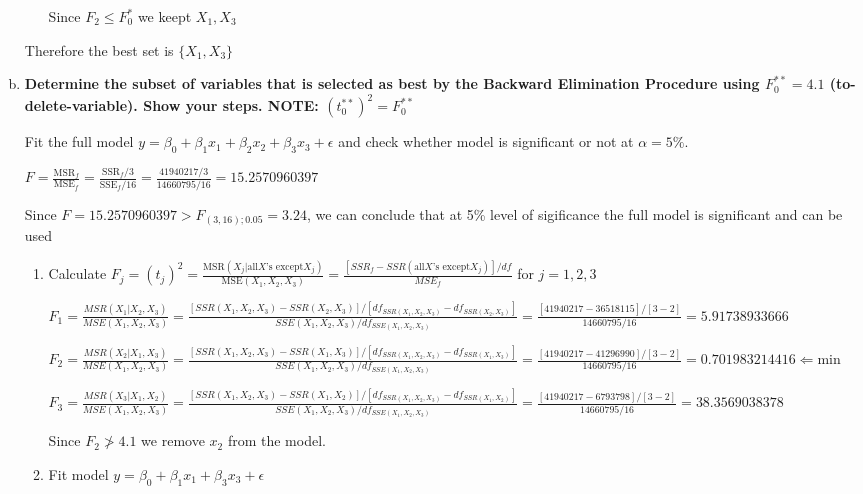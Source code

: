 \documentclass{article}
\begin{document}
\begin{enumerate}[(a)]
\begin{enumerate}[(1)]
Since $F_2 \leq F_0^*$ we keept $X_1, X_3$

\end{enumerate}

Therefore the best set is $\{X_1, X_3\}$

\item \textbf{Determine the subset of variables that is selected as best by the Backward Elimination
Procedure using $F_0^{**} = 4.1$ (to-delete-variable). Show your steps.
NOTE: $( t_0^{**} )^2 = F_0^{**}$}

Fit the full model $y = \beta_0 + \beta_1x_1 + \beta_2x_2 + \beta_3 x_3 + \epsilon$ and check whether model is significant or not at $\alpha=5\%$.

$F = \frac{\text{MSR}_f}{\text{MSE}_f} = \frac{\text{SSR}_f / 3}{\text{SSE}_f / 16} = \frac{ 41 940 217/3}{14 660 795/16} = 15.2570960397$

Since $F = 15.2570960397 > F_{(3, 16); 0.05} = 3.24$, we can conclude that at 5\% level of sigificance the full model is significant and can be used

\begin{enumerate}[(1)]

\item Calculate $F_j = (t_j)^2 = \frac{ \text{MSR}(X_j | \text{all} X \text{'s except} X_j) }{\text{MSE}(X_1, X_2, X_3)} = \frac{ [SSR_f - SSR(\text{all} X\text{'s except} X_j)]/df}{MSE_f}$ for $j = 1,2,3$

$F_1 =
\frac{ MSR(X_1 | X_2, X_3)
}{
MSE(X_1, X_2, X_3)
}
=
\frac{
[SSR(X_1, X_2, X_3) - SSR(X_2, X_3)]/[df_{SSR(X_1,X_2,X_3)} - df_{SSR(X_2,X_3)}]
}{
SSE(X_1, X_2, X_3)/df_{SSE(X_1, X_2, X_3)}
}
= 
\frac{
[41 940 217 - 36 518 115]/[3 - 2]
}{
14 660 795 / 16
}
= 5.91738933666
$

$F_2 =
\frac{ MSR(X_2 | X_1, X_3)
}{
MSE(X_1, X_2, X_3)
}
=
\frac{
[SSR(X_1, X_2, X_3) - SSR(X_1, X_3)]/[df_{SSR(X_1,X_2,X_3)} - df_{SSR(X_1,X_3)}]
}{
SSE(X_1, X_2, X_3)/df_{SSE(X_1, X_2, X_3)}
}
= 
\frac{
[41 940 217 - 41 296 990]/[3 - 2]
}{
14 660 795 / 16
}
= 0.701983214416 \Leftarrow \text{min}
$

$F_3 =
\frac{ MSR(X_3 | X_1, X_2)
}{
MSE(X_1, X_2, X_3)
}
=
\frac{
[SSR(X_1, X_2, X_3) - SSR(X_1, X_2)]/[df_{SSR(X_1,X_2,X_3)} - df_{SSR(X_1,X_2)}]
}{
SSE(X_1, X_2, X_3)/df_{SSE(X_1, X_2, X_3)}
}
= 
\frac{
[41 940 217 - 6 793 798]/[3 - 2]
}{
14 660 795 / 16
}
= 38.3569038378
$

Since $F_2 \ngtr 4.1$ we remove $x_2$ from the model.

\item Fit model $y = \beta_0 + \beta_1x_1 + \beta_3x_3 + \epsilon$


\end{enumerate}
\end{enumerate}
\end{document}
